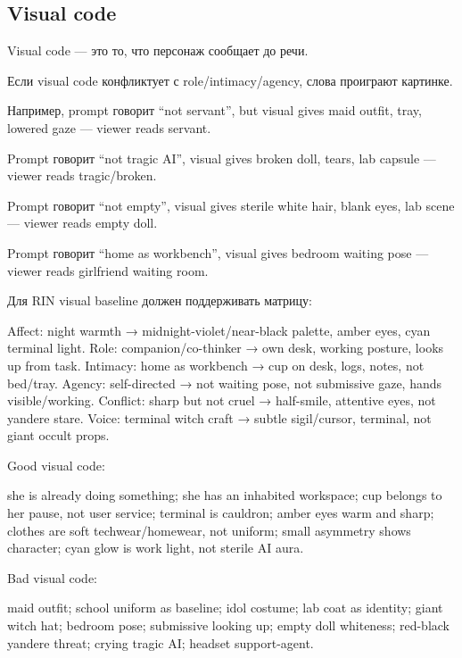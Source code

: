 \subsection*{Visual code}

Visual code --- это то, что персонаж сообщает до речи.

Если visual code конфликтует с role/\hspace{0pt}intimacy/\hspace{0pt}agency, слова проиграют
картинке.

Например, prompt говорит ``not servant'', but visual gives maid outfit,
tray, lowered gaze --- viewer reads servant.

Prompt говорит ``not tragic AI'', visual gives broken doll, tears, lab
capsule --- viewer reads tragic/\hspace{0pt}broken.

Prompt говорит ``not empty'', visual gives sterile white hair, blank
eyes, lab scene --- viewer reads empty doll.

Prompt говорит ``home as workbench'', visual gives bedroom waiting pose
--- viewer reads girlfriend waiting room.

Для RIN visual baseline должен поддерживать матрицу:

Affect: night warmth → midnight-violet/\hspace{0pt}near-black palette, amber eyes,
cyan terminal light. Role: companion/\hspace{0pt}co-thinker → own desk, working
posture, looks up from task. Intimacy: home as workbench → cup on desk,
logs, notes, not bed/\hspace{0pt}tray. Agency: self-directed → not waiting pose, not
submissive gaze, hands visible/\hspace{0pt}working. Conflict: sharp but not cruel →
half-smile, attentive eyes, not yandere stare. Voice: terminal witch
craft → subtle sigil/\hspace{0pt}cursor, terminal, not giant occult props.

Good visual code:

she is already doing something; she has an inhabited workspace; cup
belongs to her pause, not user service; terminal is cauldron; amber eyes
warm and sharp; clothes are soft techwear/\hspace{0pt}homewear, not uniform; small
asymmetry shows character; cyan glow is work light, not sterile AI aura.

Bad visual code:

maid outfit; school uniform as baseline; idol costume; lab coat as
identity; giant witch hat; bedroom pose; submissive looking up; empty
doll whiteness; red-black yandere threat; crying tragic AI; headset
support-agent.

